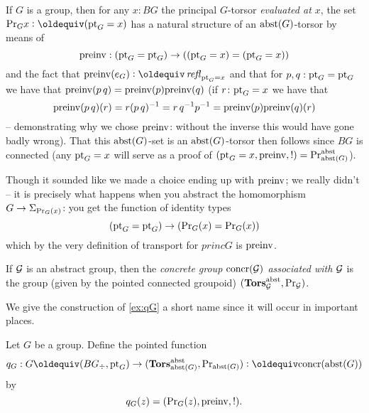 \begin{example}\label{ex:qG}
  If $G$ is a group, then for any $x:BG$ the principal $G$-torsor \emph{evaluated at $x$}, \ie the set $\princ Gx\defequi(\pt_G=x)$ has a natural structure of an $\mathrm{abst}(G)$-torsor by means of 
$$\mathrm{preinv}:({\mathord{\mathrm{pt}}}_G={\mathord{\mathrm{pt}}}_G)\to (({\mathord{\mathrm{pt}}}_G=x)=({\mathord{\mathrm{pt}}}_G=x))$$ and the fact that $\preinv(e_G)\defequi\refl{\pt_G=x}$ and that for $p,q:{\mathord{\mathrm{pt}}}_G={\mathord{\mathrm{pt}}}_G$ we have that  $\mathrm{preinv}(p\,q)=\mathrm{preinv}(p)\mathrm{preinv}(q)$ (\ie if $r\colon {\mathord{\mathrm{pt}}}_G=x$ we have that 
$$\mathrm{preinv}(p\, q)(r)=r(p\,q)^{-1}=r\,q^{-1}p^{-1}=\mathrm{preinv}(p)\mathrm{preinv}(q)(r)$$  -- demonstrating why we chose $\mathrm{preinv}$: without the inverse this would have gone badly wrong).  
That this $\mathrm{abst}(G)$-set is an $\mathrm{abst}(G)$-torsor then follows since $BG$ is connected (any ${\mathord{\mathrm{pt}}}_G=x$ will serve as a proof of $({\mathord{\mathrm{pt}}}_G=x,\mathrm{preinv},!)=\mathrm{Pr}_{{\mathrm{abst}(G)}}^{\mathrm{abst}}$).

Though it sounded like we made a choice ending up with $\mathrm{preinv}$; we really didn't -- it is precisely what happens when you abstract the homomorphism $G\to\Sigma_{\mathrm{Pr}_{{G}}(x)}$: 
you get the function of identity types 
$$({\mathord{\mathrm{pt}}}_G={\mathord{\mathrm{pt}}}_G)\to (\mathrm{Pr}_{{G}}(x)=\mathrm{Pr}_{{G}}(x))$$ 
which by the very definition of transport for $princ G$ is $\mathrm{preinv}$. 
\end{example}

\begin{definition}
  If ${\mathcal G}$ is an abstract group, then the \emph{concrete group $\mathrm{concr}({\mathcal G})$ associated with ${\mathcal G}$} is the group (given by the pointed connected groupoid) $(\mathbf{Tors}_{\mathcal G}^{\mathrm{abst}},\mathrm{Pr}_{{\mathcal G}})$.
\end{definition}
We give the construction of \cref{ex:qG} a short name since it will occur in important places.
\begin{definition}
  Let $G$ be a group.  Define the pointed function
$$q_G:G\oldequiv(BG_\div,\pt_G)\to (\typetorsor^\abstr_{\abstr(G)},\princ {\abstr(G)})\defequi\concr(\abstr(G))$$
by $$
q_G(z)=(\princ G(z),\preinv%
,!).$$
\end{definition}


